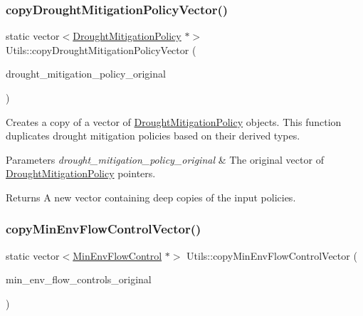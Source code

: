 \subsubsection{\texorpdfstring{copy\+Drought\+Mitigation\+Policy\+Vector()}{copyDroughtMitigationPolicyVector()}}
{\footnotesize\ttfamily static vector$<$\mbox{\hyperlink{classDroughtMitigationPolicy}{Drought\+Mitigation\+Policy}} $\ast$$>$ Utils\+::copy\+Drought\+Mitigation\+Policy\+Vector (\begin{DoxyParamCaption}\item[{vector$<$ \mbox{\hyperlink{classDroughtMitigationPolicy}{Drought\+Mitigation\+Policy}} $\ast$$>$}]{drought\+\_\+mitigation\+\_\+policy\+\_\+original }\end{DoxyParamCaption})\hspace{0.3cm}{\ttfamily [static]}}



Creates a copy of a vector of {\ttfamily \mbox{\hyperlink{classDroughtMitigationPolicy}{Drought\+Mitigation\+Policy}}} objects. This function duplicates drought mitigation policies based on their derived types. 


\begin{DoxyParams}{Parameters}
{\em drought\+\_\+mitigation\+\_\+policy\+\_\+original} & The original vector of {\ttfamily \mbox{\hyperlink{classDroughtMitigationPolicy}{Drought\+Mitigation\+Policy}}} pointers.\\
\hline
\end{DoxyParams}
\begin{DoxyReturn}{Returns}
A new vector containing deep copies of the input policies. 
\end{DoxyReturn}
\mbox{\label{classUtils_a16d5d6b3ada64b5f018478e972b66b2a}} 
\subsubsection{\texorpdfstring{copy\+Min\+Env\+Flow\+Control\+Vector()}{copyMinEnvFlowControlVector()}}
{\footnotesize\ttfamily static vector$<$\mbox{\hyperlink{classMinEnvFlowControl}{Min\+Env\+Flow\+Control}} $\ast$$>$ Utils\+::copy\+Min\+Env\+Flow\+Control\+Vector (\begin{DoxyParamCaption}\item[{vector$<$ \mbox{\hyperlink{classMinEnvFlowControl}{Min\+Env\+Flow\+Control}} $\ast$$>$}]{min\+\_\+env\+\_\+flow\+\_\+controls\+\_\+original }\end{DoxyParamCaption})\hspace{0.3cm}{\ttfamily [static]}}



